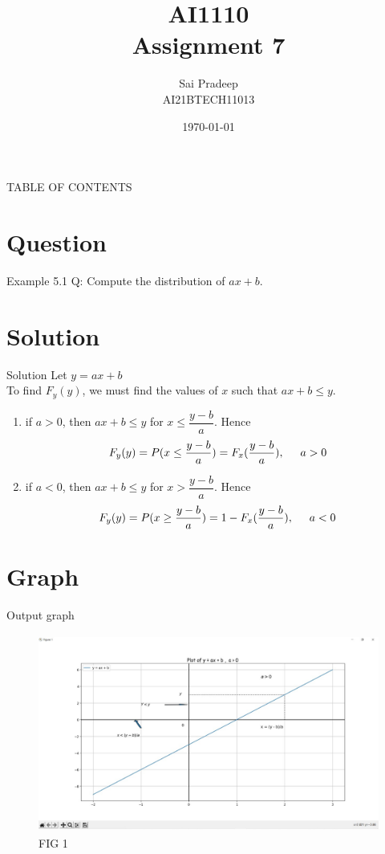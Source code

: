 \documentclass{beamer}
\title{AI1110 \\ Assignment 7}
\author{Sai Pradeep \\ AI21BTECH11013}
\date{\today}
\begin{document}
\begin{frame}
    \titlepage 
\end{frame}
\logo{}

\begin{frame}{}
TABLE OF CONTENTS
    \tableofcontents
\end{frame}

\section{Question}
\begin{frame}{Example 5.1}
Q: Compute the distribution of $ax+b$. 
\end{frame}
\section{Solution}
\begin{frame}{Solution}
    Let $y = ax+b$ \\
    To find $F_y(y)$, we must find the values of $x$ such that $ax+b \le y$.
    \begin{enumerate}
    \item if $a > 0$, then $ax+b \le y$ for $x \le \dfrac{y-b}{a}$. Hence 
        \begin{align}
            F_y(y) = P(x \le \frac{y-b}{a})= F_x(\frac{y-b}{a}) , \hspace{5mm}  a>0
        \end{align} 
\item  if $a < 0$, then $ax+b \le y$ for $x > \dfrac{y-b}{a}$. Hence 
        \begin{align}
            F_y(y) = P(x \ge \frac{y-b}{a})= 1-F_x(\frac{y-b}{a}) , \hspace{5mm}  a<0
        \end{align} 
    \end{enumerate}
\end{frame}
\section{Graph}
\begin{frame}{Output graph}
    \begin{figure}[!ht]
		\centering
		\includegraphics[width=\textwidth,height=6.5cm,keepaspectratio]{figures/Python_code_output.jpeg}
		\caption{FIG 1}
		\label{fig1}
	\end{figure}
\end{frame}
\end{document}
